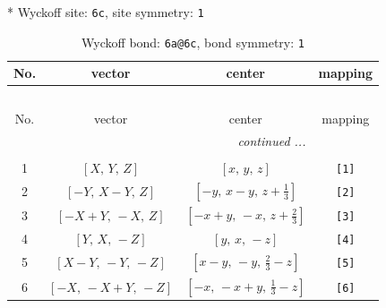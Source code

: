 \documentclass[fleqn,8pt]{jsarticle}
\begin{document}
* Wyckoff site: {\tt 6c}, site symmetry: {\tt 1}
\renewcommand{\arraystretch}{1.2}
\begin{longtable}{cccc}
\caption{Wyckoff bond: {\tt 6a@6c}, bond symmetry: {\tt 1}}
 \\
 \hline \hline
No. & vector & center & mapping \\ \hline \endfirsthead

\multicolumn{3}{l}{\tablename\ \thetable{}} \\
 \hline \hline
No. & vector & center & mapping \\ \hline \endhead

 \hline \hline
\multicolumn{3}{r}{\footnotesize\it continued ...} \\ \endfoot

 \hline \hline
\multicolumn{3}{r}{} \\ \endlastfoot

1 & $\left[ X,\, Y,\, Z \right]$ & $\left[ x,\, y,\, z \right]$ & {\tt [1]} \\ \hline
2 & $\left[ - Y,\, X - Y,\, Z \right]$ & $\left[ - y,\, x - y,\, z + \frac{1}{3} \right]$ & {\tt [2]} \\ \hline
3 & $\left[ - X + Y,\, - X,\, Z \right]$ & $\left[ - x + y,\, - x,\, z + \frac{2}{3} \right]$ & {\tt [3]} \\ \hline
4 & $\left[ Y,\, X,\, - Z \right]$ & $\left[ y,\, x,\, - z \right]$ & {\tt [4]} \\ \hline
5 & $\left[ X - Y,\, - Y,\, - Z \right]$ & $\left[ x - y,\, - y,\, \frac{2}{3} - z \right]$ & {\tt [5]} \\ \hline
6 & $\left[ - X,\, - X + Y,\, - Z \right]$ & $\left[ - x,\, - x + y,\, \frac{1}{3} - z \right]$ & {\tt [6]} \\
\end{longtable}
\end{document}

